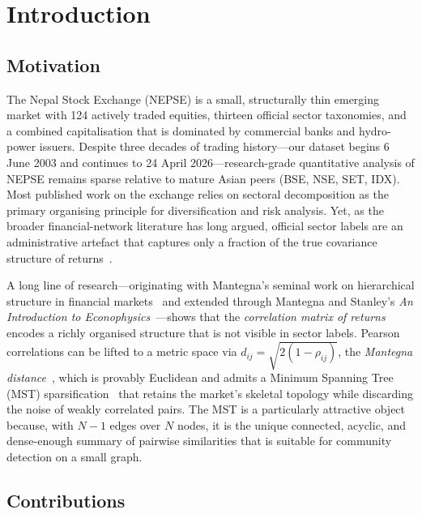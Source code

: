\section{Introduction}

\subsection{Motivation}
\label{sec:motivation}

The Nepal Stock Exchange (NEPSE) is a small, structurally thin emerging
market with 124 actively traded equities, thirteen official sector
taxonomies, and a combined capitalisation that is dominated by commercial
banks and hydro-power issuers.  Despite three decades of trading
history---our dataset begins 6 June 2003 and continues to
24 April 2026---research-grade quantitative analysis of
NEPSE remains sparse relative to mature Asian peers (BSE, NSE, SET, IDX).
Most published work on the exchange relies on sectoral decomposition as
the primary organising principle for diversification and risk analysis.
Yet, as the broader financial-network literature has long argued,
official sector labels are an administrative artefact that captures only
a fraction of the true covariance structure of
returns~\cite{bonanno2001topology, mantegna1999hierarchical, onnela2003dynamics,
podosu2013network}.

A long line of research---originating with Mantegna's seminal work on
hierarchical structure in financial
markets~\cite{mantegna1999hierarchical} and extended through Mantegna and
Stanley's \emph{An Introduction to
Econophysics}~\cite{mantegna1999introduction}---shows that the
\emph{correlation matrix of returns} encodes a richly organised structure
that is not visible in sector labels.  Pearson correlations can be lifted
to a metric space via $d_{ij}=\sqrt{2(1-\rho_{ij})}$, the
\emph{Mantegna distance}~\cite{mantegna1999hierarchical,onnela2003dynamics},
which is provably Euclidean and admits a Minimum Spanning Tree (MST)
sparsification~\cite{kruskal1956shortest} that retains the market's
skeletal topology while discarding the noise of weakly correlated pairs.
The MST is a particularly attractive object because, with $N-1$ edges
over $N$ nodes, it is the unique connected, acyclic, and dense-enough
summary of pairwise similarities that is suitable for community
detection on a small graph.

\subsection{Contributions}
\label{sec:contributions}


